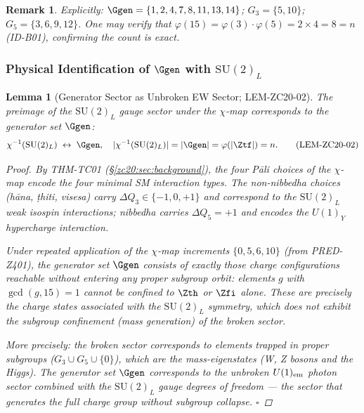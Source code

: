 \documentclass[12pt, a4paper]{article}
\newtheorem{lemma}{Lemma}[section]
\newtheorem{remark}{Remark}[section]
\begin{document}
\begin{remark}
Explicitly:
$\Ggen = \{1, 2, 4, 7, 8, 11, 13, 14\}$;
$G_3 = \{5, 10\}$;
$G_5 = \{3, 6, 9, 12\}$.
One may verify that $\varphi(15) = \varphi(3)\cdot\varphi(5) = 2\times 4 = 8 = n$
(ID-B01), confirming the count is exact.
\end{remark}

\subsubsection{Physical Identification of $\Ggen$ with $\mathrm{SU}(2)_L$}

\begin{lemma}[Generator Sector as Unbroken EW Sector; LEM-ZC20-02]
\label{zc20:lem:su2-ggen}
The preimage of the $\mathrm{SU}(2)_L$ gauge sector under
the $\chi$-map corresponds to the generator set $\Ggen$:
\begin{equation}
  \chi^{-1}(\mathrm{SU}(2)_L) \;\leftrightarrow\; \Ggen,
  \quad |\chi^{-1}(\mathrm{SU}(2)_L)| = |\Ggen| = \varphi(|\Ztf|) = n.
  \tag{LEM-ZC20-02}
\end{equation}

\begin{proof}
By THM-TC01 (\S\ref{zc20:sec:background}), the four Pāli choices
of the $\chi$-map encode the four minimal SM interaction types.
The non-nibbedha choices (hāna, ṭhiti, visesa) carry $\Delta Q_3
\in \{-1, 0, +1\}$ and correspond to the $\mathrm{SU}(2)_L$
weak isospin interactions; nibbedha carries $\Delta Q_5 = +1$
and encodes the $U(1)_Y$ hypercharge interaction.

Under repeated application of the $\chi$-map increments
$\{0, 5, 6, 10\}$ (from PRED-Z401), the generator set $\Ggen$
consists of exactly those charge configurations reachable without
entering any proper subgroup orbit: elements $g$ with $\gcd(g,15)=1$
cannot be confined to $\Zth$ or $\Zfi$ alone.
These are precisely the charge states associated with the
$\mathrm{SU}(2)_L$ symmetry, which does not exhibit the
subgroup confinement (mass generation) of the broken sector.

More precisely: the broken sector corresponds to elements
trapped in proper subgroups ($G_3 \cup G_5 \cup \{0\}$),
which are the mass-eigenstates (W, Z bosons and the Higgs).
The generator set $\Ggen$ corresponds to the unbroken $U(1)_{\rm em}$
photon sector combined with the $\mathrm{SU}(2)_L$ gauge degrees
of freedom --- the sector that generates the full charge group
without subgroup collapse.
\hfill$\square$
\end{proof}
\end{lemma}
\end{document}
